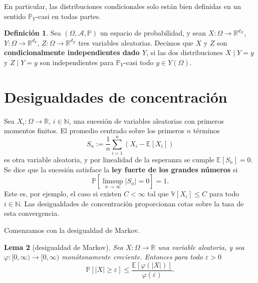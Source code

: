 \documentclass[11pt]{report}
\newenvironment{tcolorbox}[1][]{\par\medskip\noindent\ignorespaces}{\par\medskip}
\theoremstyle{definition}
\newtheorem{definicion}{Definición}[section]
\theoremstyle{plain}
\newtheorem{lema}[definicion]{Lema}
\numberwithin{equation}{section}
\begin{document}
En particular, las distribuciones condicionales solo están bien definidas en un sentido \(\mathbb{P}_Y\)-casi en todas partes.

\begin{tcolorbox}[colback=blue!8, colframe=blue!8, boxrule=0pt]
\begin{definicion}
Sea \((\Omega,\mathcal{A},\mathbb{P})\) un espacio de probabilidad, y sean \(X:\Omega\to\mathbb{R}^{d_X}\), \(Y:\Omega\to\mathbb{R}^{d_Y}\), \(Z:\Omega\to\mathbb{R}^{d_Z}\) tres variables aleatorias. Decimos que \(X\) y \(Z\) son \textbf{condicionalmente independientes dado \(Y\)}, si las dos distribuciones \(X\mid Y=y\) y \(Z\mid Y=y\) son independientes para \(\mathbb{P}_Y\)-casi todo \(y\in Y(\Omega)\).
\end{definicion}
\end{tcolorbox}

\section{Desigualdades de concentración}

Sea \(X_i:\Omega\to\mathbb{R}\), \(i\in\mathbb{N}\), una sucesión de variables aleatorias con primeros momentos finitos. El promedio centrado sobre los primeros \(n\) términos
\begin{equation*}
    S_n:=\frac{1}{n}\sum_{i=1}^{n}(X_i-\mathbb{E}[X_i])
    \tag{A.4.1}
\end{equation*}
es otra variable aleatoria, y por linealidad de la esperanza se cumple \(\mathbb{E}[S_n]=0\). Se dice que la sucesión satisface la \textbf{ley fuerte de los grandes números} si
\begin{equation*}
    \mathbb{P}\left[\limsup_{n\to\infty}|S_n|=0\right]=1.
\end{equation*}
Este es, por ejemplo, el caso si existen \(C<\infty\) tal que \(\mathbb{V}[X_i]\leq C\) para todo \(i\in\mathbb{N}\). Las desigualdades de concentración proporcionan cotas sobre la tasa de esta convergencia.

Comenzamos con la desigualdad de Markov.

\begin{tcolorbox}[colback=blue!8, colframe=blue!8, boxrule=0pt]
\begin{lema}[desigualdad de Markov]
Sea \(X:\Omega\to\mathbb{R}\) una variable aleatoria, y sea \(\varphi:[0,\infty)\to[0,\infty)\) monótonamente creciente. Entonces para todo \(\varepsilon>0\)
\begin{equation*}
    \mathbb{P}[|X|\geq\varepsilon]
    \leq
    \frac{\mathbb{E}[\varphi(|X|)]}{\varphi(\varepsilon)}.
\end{equation*}
\end{lema}
\end{tcolorbox}
\end{document}
